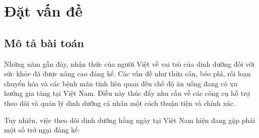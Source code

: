 
\chapter{Đặt vấn đề}

\section{Mô tả bài toán}

Những năm gần đây, nhận thức của người Việt về vai trò của dinh dưỡng đối với sức khỏe đã được nâng cao đáng kể. Các vấn đề như thừa cân, béo phì, rối loạn chuyển hóa và các bệnh mãn tính liên quan đến chế độ ăn uống đang có xu hướng gia tăng tại Việt Nam. Điều này thúc đẩy nhu cầu về các công cụ hỗ trợ theo dõi và quản lý dinh dưỡng cá nhân một cách thuận tiện và chính xác.

Tuy nhiên, việc theo dõi dinh dưỡng hằng ngày tại Việt Nam hiện đang gặp phải một số trở ngại đáng kể:

